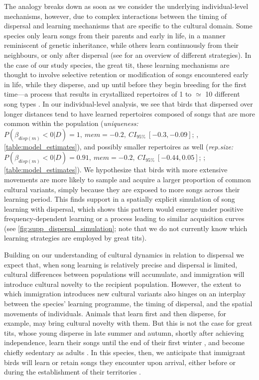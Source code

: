 \documentclass[9pt, onecolumn, twoside, lineno]{gsajnl}
\begin{document}
The analogy breaks down as soon as we consider the underlying individual-level mechanisms, however, due to complex interactions between the timing of dispersal and learning mechanisms that are specific to the cultural domain. Some species only learn songs from their parents and early in life, in a manner reminiscent of genetic inheritance, while others learn continuously from their neighbours, or only after dispersal (see \autocite{searcy2021} for an overview of different strategies). In the case of our study species, the great tit, these learning mechanisms are thought to involve selective retention or modification of songs encountered early in life, while they disperse, and up until before they begin breeding for the first time---a process that results in crystallized repertoires of 1 to $\simeq$ 10 different song types \autocite{mcgregor1982b,rivera-gutierrez2011,merinorecalde2024}. In our individual-level analysis, we see that birds that dispersed over longer distances tend to have learned repertoires composed of songs that are more common within the population (\textit{uniqueness:} $P(\beta_{disp (m)} < 0 | D) = 1,~mem = -0.2,~CI_{95\%}~[-0.3, -0.09]$; , \autoref{table:model_estimates}), and possibly smaller repertoires as well (\textit{rep.size:} $P(\beta_{disp (m)} < 0 | D) = 0.91,~mem = -0.2,~CI_{95\%}~[-0.44, 0.05]$; ; \autoref{table:model_estimates}). We hypothesize that birds with more extensive movements are more likely to sample and acquire a larger proportion of common cultural variants, simply because they are exposed to more songs across their learning period. This finds support in a spatially explicit simulation of song learning with dispersal, which shows this pattern would emerge under positive frequency-dependent learning or a process leading to similar acquisition curves (see \autoref{fig:supp_dispersal_simulation}; note that we do not currently know which learning strategies are employed by great tits).

Building on our understanding of cultural dynamics in relation to dispersal we expect that, when song learning is relatively precise and dispersal is limited, cultural differences between populations will accumulate, and immigration will introduce cultural novelty to the recipient population. However, the extent to which immigration introduces new cultural variants also hinges on an interplay between the species' learning programme, the timing of dispersal, and the spatial movements of individuals. Animals that learn first and then disperse, for example, may bring cultural novelty with them. But this is not the case for great tits, whose young disperse in late summer and autumn, shortly after achieving independence, learn their songs until the end of their first winter \autocite{rivera-gutierrez2011}, and become chiefly sedentary as adults \autocite{greenwood1979, dhondt1979, dingemanse2003}. In this species, then, we anticipate that immigrant birds will learn or retain songs they encounter upon arrival, either before or during the establishment of their territories \autocite{keen2020, graham2018}.
\end{document}
